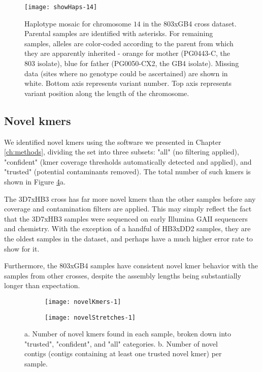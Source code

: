 \begin{figure}[h!]
  \centering
    \texttt{[image: showHaps-14]}
  \caption{Haplotype mosaic for chromosome $14$ in the 803xGB4 cross dataset.  Parental samples are identified with asterisks.  For remaining samples, alleles are color-coded according to the parent from which they are apparently inherited - orange for mother (PG0443-C, the 803 isolate), blue for father (PG0050-CX2, the GB4 isolate).  Missing data (sites where no genotype could be ascertained) are shown in white.  Bottom axis represents variant number.  Top axis represents variant position along the length of the chromosome.}
  \label{fig:showHaps}
\end{figure}


\subsection{Novel kmers}

We identified novel kmers using the software we presented in Chapter \ref{ch:methods}, dividing the set into three subsets: "all" (no filtering applied), "confident" (kmer coverage thresholds automatically detected and applied), and "trusted" (potential contaminants removed).  The total number of such kmers is shown in Figure \ref{fig:novelty}a.

The 3D7xHB3 cross has far more novel kmers than the other samples before any coverage and contamination filters are applied.  This may simply reflect the fact that the 3D7xHB3 samples were sequenced on early Illumina GAII sequencers and chemistry.  With the exception of a handful of HB3xDD2 samples, they are the oldest samples in the dataset, and perhaps have a much higher error rate to show for it.

Furthermore, the 803xGB4 samples have consistent novel kmer behavior with the samples from other crosses, despite the assembly lengths being substantially longer than expectation.

\begin{figure}
\begin{subfigure}{.5\textwidth}
  \centering
  \texttt{[image: novelKmers-1]}
  \label{fig:novelKmers-1}
\end{subfigure}%
\begin{subfigure}{.5\textwidth}
  \centering
  \texttt{[image: novelStretches-1]}
  \label{fig:novelStretches-1}
\end{subfigure}
\caption{a. Number of novel kmers found in each sample, broken down into "trusted", "confident", and "all" categories.  b. Number of novel contigs (contigs containing at least one trusted novel kmer) per sample.}
\label{fig:novelty}
\end{figure}

